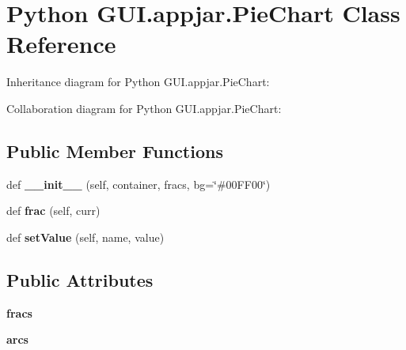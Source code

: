 \hypertarget{class_python_01_g_u_i_1_1appjar_1_1_pie_chart}{}\section{Python G\+U\+I.\+appjar.\+Pie\+Chart Class Reference}
\label{class_python_01_g_u_i_1_1appjar_1_1_pie_chart}


Inheritance diagram for Python G\+U\+I.\+appjar.\+Pie\+Chart\+:


Collaboration diagram for Python G\+U\+I.\+appjar.\+Pie\+Chart\+:
\subsection*{Public Member Functions}
\begin{DoxyCompactItemize}
\item 
\mbox{\label{class_python_01_g_u_i_1_1appjar_1_1_pie_chart_a730ea5e8f6fc8b1f8eb19cd82f175dcd}} 
def {\bfseries \+\_\+\+\_\+init\+\_\+\+\_\+} (self, container, fracs, bg=\char`\"{}\#00\+F\+F00\char`\"{})
\item 
\mbox{\label{class_python_01_g_u_i_1_1appjar_1_1_pie_chart_a9626c88b03b0d8f2e9344db8fc2185c6}} 
def {\bfseries frac} (self, curr)
\item 
\mbox{\label{class_python_01_g_u_i_1_1appjar_1_1_pie_chart_a3051c1048b69925ab0f05c699f936959}} 
def {\bfseries set\+Value} (self, name, value)
\end{DoxyCompactItemize}
\subsection*{Public Attributes}
\begin{DoxyCompactItemize}
\item 
\mbox{\label{class_python_01_g_u_i_1_1appjar_1_1_pie_chart_aa7afcf4a0755570e2242d0f6d176ddf8}} 
{\bfseries fracs}
\item 
\mbox{\label{class_python_01_g_u_i_1_1appjar_1_1_pie_chart_a5f471dcca0296775de1babaf897c07f1}} 
{\bfseries arcs}
\end{DoxyCompactItemize}

